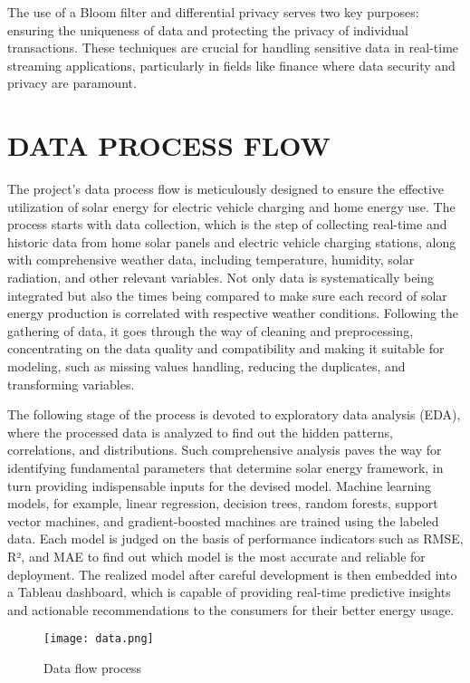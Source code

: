 \documentclass[conference]{IEEEtran}
\begin{document}
The use of a Bloom filter and differential privacy serves two key purposes: ensuring the uniqueness of data and protecting the privacy of individual transactions. These techniques are crucial for handling sensitive data in real-time streaming applications, particularly in fields like finance where data security and privacy are paramount. \\

\section{DATA PROCESS FLOW}
The project's data process flow is meticulously designed to ensure the effective utilization of solar energy for electric vehicle charging and home energy use. The process starts with data collection, which is the step of collecting real-time and historic data from home solar panels and electric vehicle charging stations, along with comprehensive weather data, including temperature, humidity, solar radiation, and other relevant variables. Not only data is systematically being integrated but also the times being compared to make sure each record of solar energy production is correlated with respective weather conditions. Following the gathering of data, it goes through the way of cleaning and preprocessing, concentrating on the data quality and compatibility and making it suitable for modeling, such as missing values handling, reducing the duplicates, and transforming variables.

The following stage of the process is devoted to exploratory data analysis (EDA), where the processed data is analyzed to find out the hidden patterns, correlations, and distributions. Such comprehensive analysis paves the way for identifying fundamental parameters that determine solar energy framework, in turn providing indispensable inputs for the devised model. Machine learning models, for example, linear regression, decision trees, random forests, support vector machines, and gradient-boosted machines are trained using the labeled data. Each model is judged on the basis of performance indicators such as RMSE, R², and MAE to find out which model is the most accurate and reliable for deployment. The realized model after careful development is then embedded into a Tableau dashboard, which is capable of providing real-time predictive insights and actionable recommendations to the consumers for their better energy usage.

\begin{figure}[H] %
    \centering
    \texttt{[image: data.png]}
    \caption{Data flow process}
    \label{fig:technical_workflow}
\end{figure}
\end{document}
